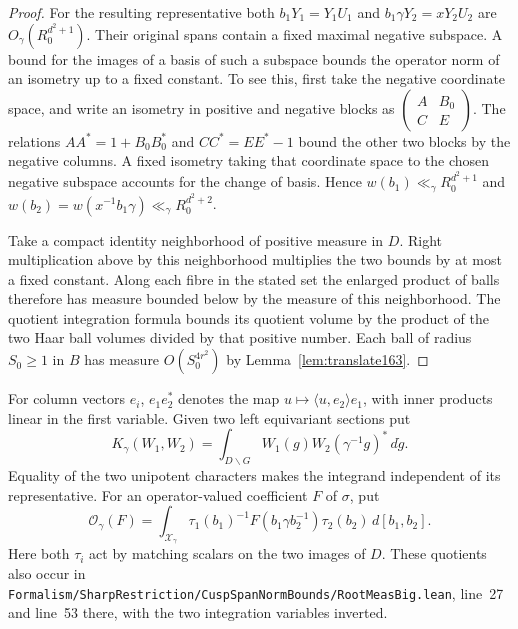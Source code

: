 \documentclass[a4paper,11pt]{article}
\theoremstyle{definition}
\theoremstyle{remark}
\newcommand{\srcloc}[2]{{\small\nolinkurl{#1.lean}}, line~#2}
\numberwithin{equation}{section}
\begin{document}
\begin{proof}
For the resulting representative both \(b_1Y_1=Y_1 U_1\) and
\(b_1\gamma Y_2=xY_2 U_2\) are \(O_\gamma(R_0^{d^2+1})\).
Their original spans contain a fixed maximal negative subspace.
A bound for the images of a basis of such a subspace bounds the
operator norm of an isometry up to a fixed constant. To see this,
first take the negative coordinate space, and write an isometry
in positive and negative blocks as
\(\left(\begin{smallmatrix}A&B_0\\ C&E\end{smallmatrix}\right)\).
The relations \(AA^*=1+B_0B_0^*\) and \(CC^*=EE^*-1\)
bound the other two blocks by the negative columns. A fixed
isometry taking that coordinate space to the chosen negative
subspace accounts for the change of basis.
Hence \(w(b_1)\ll_\gamma R_0^{d^2+1}\) and
\(w(b_2)=w(x^{-1}b_1\gamma)\ll_\gamma R_0^{d^2+2}\).

Take a compact identity neighborhood of positive measure in \(D\).
Right multiplication above by this neighborhood multiplies the
two bounds by at most a fixed constant. Along each fibre in the
stated set the enlarged product of balls therefore has measure
bounded below by the measure of this neighborhood. The quotient
integration formula bounds its quotient volume by the product of
the two Haar ball volumes divided by that positive number.
Each ball of radius \(S_0\ge1\) in \(B\) has measure
\(O(S_0^{4r^2})\) by Lemma~\ref{lem:translate163}.
\end{proof}

For column vectors \(e_i\), \(e_1 e_2^*\) denotes the map
\(u\mapsto\langle u,e_2\rangle e_1\), with inner products linear
in the first variable. Given two left equivariant sections put
\[
 K_\gamma(W_1,W_2)=
 \int_{D\backslash G} W_1(g)W_2(\gamma^{-1}g)^*\,d\dot g .
\]
Equality of the two unipotent characters makes the integrand
independent of its representative. For an operator-valued
coefficient \(F\) of \(\sigma\), put
\[
 \mathcal O_\gamma(F)=
  \int_{\mathcal X_\gamma}
   \tau_1(b_1)^{-1} F(b_1\gamma b_2^{-1})\tau_2(b_2)
                                                     \,d[b_1,b_2].
\]
Here both \(\tau_i\) act by matching scalars on the two images
of \(D\). These quotients also occur in
\srcloc{Formalism/SharpRestriction/CuspSpanNormBounds/RootMeasBig}{27}
and line~53 there, with the two integration variables inverted.
\end{document}
